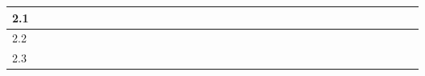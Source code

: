 \begin{table}[]
\begin{tabular}{|l|l|l|l|l|l|l|l|l|l|l|l|l|l|l|l|l|l|l|l|l|l|l|l|l|l|l|l|l|l|l|l|l|l|l|}
    2.1   & \cellcolor[HTML]{000000}                        & \cellcolor[HTML]{000000} & \cellcolor[HTML]{000000} &                          &                          &                          & \cellcolor[HTML]{000000} &                          &                          &                          &                          & \cellcolor[HTML]{000000} &                          &                          & \cellcolor[HTML]{000000} &                          & \cellcolor[HTML]{000000} & \cellcolor[HTML]{000000} &                          &                          &                          & \cellcolor[HTML]{000000} &                          &                          &                          &                          & \cellcolor[HTML]{000000} & \cellcolor[HTML]{000000} & \cellcolor[HTML]{000000} &                          &                          &                          & \cellcolor[HTML]{000000} &                          \\ \hline
    2.2   & \cellcolor[HTML]{000000}                        & \cellcolor[HTML]{000000} & \cellcolor[HTML]{000000} &                          &                          &                          & \cellcolor[HTML]{000000} &                          &                          &                          &                          & \cellcolor[HTML]{000000} &                          &                          &                          &                          & \cellcolor[HTML]{000000} & \cellcolor[HTML]{000000} &                          &                          &                          &                          & \cellcolor[HTML]{000000} &                          & \cellcolor[HTML]{000000} & \cellcolor[HTML]{000000} & \cellcolor[HTML]{000000} & \cellcolor[HTML]{000000} & \cellcolor[HTML]{000000} &                          &                          &                          & \cellcolor[HTML]{000000} &                          \\ \hline
    2.3   & \cellcolor[HTML]{000000}                        & \cellcolor[HTML]{000000} & \cellcolor[HTML]{000000} &                          &                          &                          & \cellcolor[HTML]{000000} &                          &                          &                          &                          & \cellcolor[HTML]{000000} &                          &                          &                          &                          &                          &                          &                          &                          & \cellcolor[HTML]{000000} &                          &                          &                          &                          &                          & \cellcolor[HTML]{000000} & \cellcolor[HTML]{000000} & \cellcolor[HTML]{000000} &                          &                          &                          & \cellcolor[HTML]{000000} &                          \\ \hline

\end{tabular}
\end{table}
